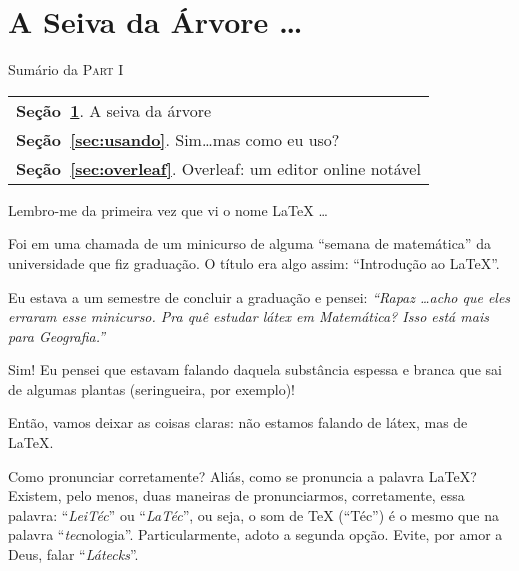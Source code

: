 \section{A Seiva da Árvore \ldots}\label{sec:seiva} %

\begin{margintable}\vspace{.8in}\footnotesize
  \caption{Sumário da \textsc{Part I}} 
  \medskip  
  \begin{tabularx}{\marginparwidth}{|X}
    \textbf{\sffamily \textcolor{azulUFRB}{Seção}~\ref{sec:seiva}}.    {\sffamily A seiva da árvore}                  \\
    \textbf{\sffamily \textcolor{azulUFRB}{Seção}~\ref{sec:usando}}.   {\sffamily Sim\ldots mas como eu uso?}         \\
    \textbf{\sffamily \textcolor{azulUFRB}{Seção}~\ref{sec:overleaf}}. {\sffamily Overleaf: um editor online notável} \\
  \end{tabularx}
\end{margintable}

Lembro-me da primeira vez que vi o nome \LaTeX{} \ldots

Foi em uma chamada de um minicurso de alguma ``semana de matemática'' da 
universidade que fiz graduação.
O título era algo assim: ``Introdução ao \LaTeX''.

Eu estava a um semestre de concluir a graduação e pensei: 
\textit{
  ``Rapaz \ldots acho que eles erraram esse minicurso. 
  Pra quê estudar látex em Matemática? 
  Isso está mais para Geografia.''
}

Sim! 
Eu pensei que estavam falando daquela substância espessa e branca que sai de 
algumas plantas (seringueira, por exemplo)!

Então, vamos deixar as coisas claras: não estamos falando de látex, mas de \LaTeX.

\begin{atencao}{Como pronunciar corretamente?}{\exclamacao}
  Aliás, como se pronuncia a palavra \LaTeX? \\
  Existem, pelo menos, duas maneiras de pronunciarmos, corretamente, essa palavra:
  ``\textit{LeiTéc}'' ou ``\textit{LaTéc}'', ou seja, o som de \TeX{} (``Téc'') 
  é o mesmo que na palavra ``\textit{tec}nologia''. 
  Particularmente, adoto a segunda opção.
  Evite, por amor a Deus, falar ``\textit{Látecks}''. 
\end{atencao}

